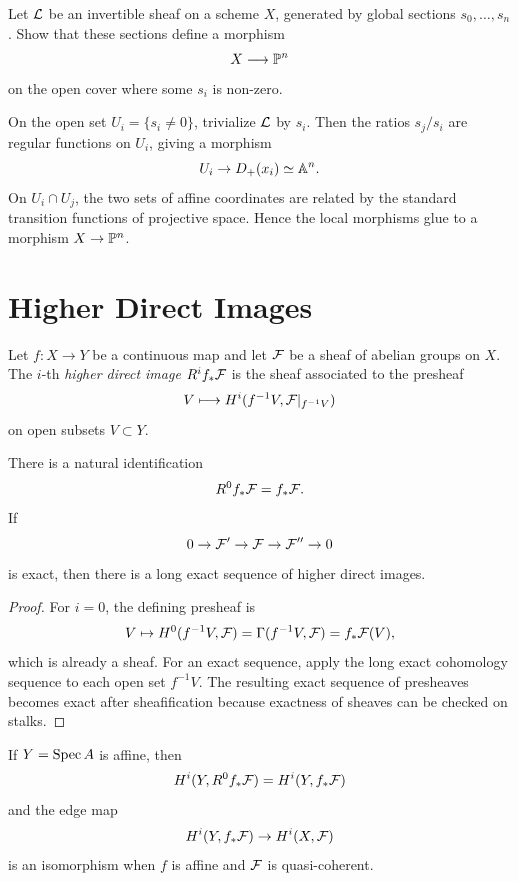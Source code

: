 \begin{exercise}\label{ex:global-generation-map}
Let \(\LL\) be an invertible sheaf on a scheme \(X\), generated by global
sections \(s_0,\ldots,s_n\).  Show that these sections define a morphism
\[
    X\longrightarrow \PP^n
\]
on the open cover where some \(s_i\) is non-zero.
\end{exercise}

\begin{solution}
On the open set \(U_i=\{s_i\ne0\}\), trivialize \(\LL\) by \(s_i\).  Then the
ratios \(s_j/s_i\) are regular functions on \(U_i\), giving a morphism
\[
    U_i\to D_+(x_i)\simeq\AA^n.
\]
On \(U_i\cap U_j\), the two sets of affine coordinates are related by the
standard transition functions of projective space.  Hence the local morphisms
glue to a morphism \(X\to\PP^n\).
\end{solution}

\section{Higher Direct Images}

\begin{definition}
Let \(f:X\to Y\) be a continuous map and let \(\FF\) be a sheaf of abelian
groups on \(X\).  The \(i\)-th \emph{higher direct image} \(R^if_*\FF\) is the
sheaf associated to the presheaf
\[
    V\longmapsto H^i(f^{-1}V,\FF|_{f^{-1}V})
\]
on open subsets \(V\subset Y\).
\end{definition}

\begin{proposition}
There is a natural identification
\[
    R^0f_*\FF=f_*\FF.
\]
If
\[
    0\to\FF'\to\FF\to\FF''\to0
\]
is exact, then there is a long exact sequence of higher direct images.
\end{proposition}

\begin{proof}
For \(i=0\), the defining presheaf is
\[
    V\mapsto H^0(f^{-1}V,\FF)=\Gamma(f^{-1}V,\FF)=f_*\FF(V),
\]
which is already a sheaf.  For an exact sequence, apply the long exact
cohomology sequence to each open set \(f^{-1}V\).  The resulting exact sequence
of presheaves becomes exact after sheafification because exactness of sheaves
can be checked on stalks.
\end{proof}

\begin{proposition}
If \(Y=\Spec A\) is affine, then
\[
    H^i(Y,R^0f_*\FF)=H^i(Y,f_*\FF)
\]
and the edge map
\[
    H^i(Y,f_*\FF)\to H^i(X,\FF)
\]
is an isomorphism when \(f\) is affine and \(\FF\) is quasi-coherent.
\end{proposition}

